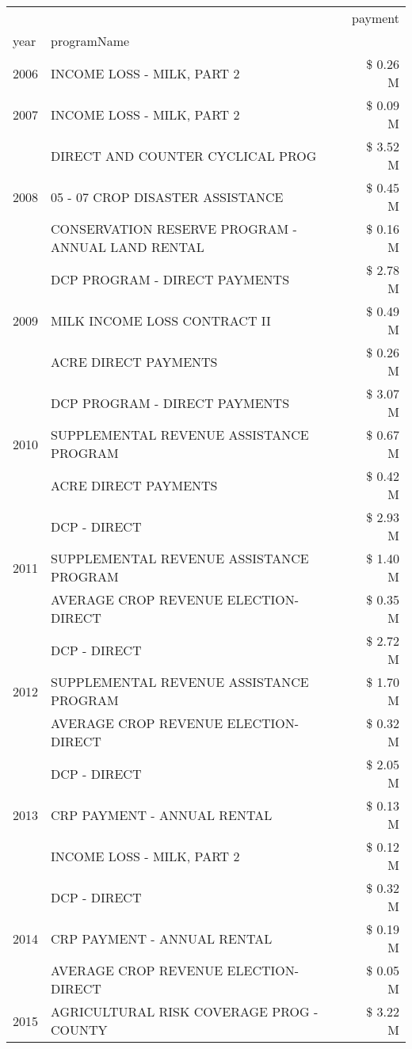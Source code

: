 \begin{tabular}{llr}
\toprule
 &  & payment \\
year & programName &  \\
\midrule
2006 & INCOME LOSS - MILK, PART 2 & \$ 0.26 M \\
\cline{1-3}
2007 & INCOME LOSS - MILK, PART 2 & \$ 0.09 M \\
\cline{1-3}
\multirow[t]{3}{*}{2008} & DIRECT AND COUNTER CYCLICAL PROG & \$ 3.52 M \\
 & 05 - 07 CROP DISASTER ASSISTANCE & \$ 0.45 M \\
 & CONSERVATION RESERVE PROGRAM - ANNUAL LAND RENTAL & \$ 0.16 M \\
\cline{1-3}
\multirow[t]{3}{*}{2009} & DCP PROGRAM - DIRECT PAYMENTS & \$ 2.78 M \\
 & MILK INCOME LOSS CONTRACT II & \$ 0.49 M \\
 & ACRE DIRECT PAYMENTS & \$ 0.26 M \\
\cline{1-3}
\multirow[t]{3}{*}{2010} & DCP PROGRAM - DIRECT PAYMENTS & \$ 3.07 M \\
 & SUPPLEMENTAL REVENUE ASSISTANCE PROGRAM & \$ 0.67 M \\
 & ACRE DIRECT PAYMENTS & \$ 0.42 M \\
\cline{1-3}
\multirow[t]{3}{*}{2011} & DCP - DIRECT & \$ 2.93 M \\
 & SUPPLEMENTAL REVENUE ASSISTANCE PROGRAM & \$ 1.40 M \\
 & AVERAGE CROP REVENUE ELECTION-DIRECT & \$ 0.35 M \\
\cline{1-3}
\multirow[t]{3}{*}{2012} & DCP - DIRECT & \$ 2.72 M \\
 & SUPPLEMENTAL REVENUE ASSISTANCE PROGRAM & \$ 1.70 M \\
 & AVERAGE CROP REVENUE ELECTION-DIRECT & \$ 0.32 M \\
\cline{1-3}
\multirow[t]{3}{*}{2013} & DCP - DIRECT & \$ 2.05 M \\
 & CRP PAYMENT - ANNUAL RENTAL & \$ 0.13 M \\
 & INCOME LOSS - MILK, PART 2 & \$ 0.12 M \\
\cline{1-3}
\multirow[t]{3}{*}{2014} & DCP - DIRECT & \$ 0.32 M \\
 & CRP PAYMENT - ANNUAL RENTAL & \$ 0.19 M \\
 & AVERAGE CROP REVENUE ELECTION-DIRECT & \$ 0.05 M \\
\cline{1-3}
\multirow[t]{3}{*}{2015} & AGRICULTURAL RISK COVERAGE PROG - COUNTY & \$ 3.22 M \\

\end{tabular}
